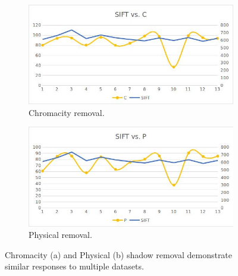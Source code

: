 \documentclass[12pt]{report}
\begin{document}
\begin{figure}
\begin{subfigure}{.49\linewidth}
\end{subfigure}
\hfill
\begin{subfigure}{.49\linewidth}
  \includegraphics[width=1\linewidth]{figures/similarities_chromacity_hallway.jpg}
  \caption{Chromacity removal.}
\end{subfigure}
\hfill
\begin{subfigure}{.49\linewidth}
  \includegraphics[width=1\linewidth]{figures/similarities_physical_hallway.jpg}
  \caption{Physical removal.}
\end{subfigure}

\caption{Chromacity (a) and Physical (b) shadow removal demonstrate similar responses to multiple datasets.}
\label{fig:similarities}
\end{figure}
\end{document}
